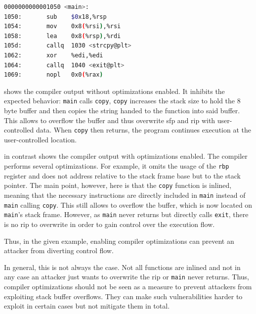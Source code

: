 \begin{lstlisting}[language=bash,float=ht,caption={Disassembly excerpt of the 64 bit binary compiled from the code in \cref{lst:optimization} with \texttt{gcc -o copy optimization.c -fno-stack-protector -O3}, retrieved with \texttt{objdump -D --no-show-raw-insn copy}}, label={lst:optimization-disassembly-optimized}]
0000000000001050 <main>:
1050:       sub    $0x18,%rsp
1054:       mov    0x8(%rsi),%rsi
1058:       lea    0x8(%rsp),%rdi
105d:       callq  1030 <strcpy@plt>
1062:       xor    %edi,%edi
1064:       callq  1040 <exit@plt>
1069:       nopl   0x0(%rax)
\end{lstlisting}

 shows the compiler output without optimizations enabled.
It inhibits the expected behavior: \texttt{main} calls \texttt{copy}, \texttt{copy} increases the stack size to hold the 8 byte buffer and then copies the string handed to the function into said buffer.
This allows to overflow the buffer and thus overwrite \gls{sfp} and \gls{rip} with user-controlled data.
When \texttt{copy} then returns, the program continues execution at the user-controlled location.

 in contrast shows the compiler output with optimizations enabled.
The compiler performs several optimizations.
For example, it omits the usage of the \texttt{rbp} register and does not address relative to the stack frame base but to the stack pointer.
The main point, however, here is that the \texttt{copy} function is inlined, meaning that the necessary instructions are directly included in \texttt{main} instead of \texttt{main} calling \texttt{copy}.
This still allows to overflow the buffer, which is now located on \texttt{main}'s stack frame.
However, as \texttt{main} never returns but directly calls \texttt{exit}, there is no \gls{rip} to overwrite in order to gain control over the execution flow.

Thus, in the given example, enabling compiler optimizations can prevent an attacker from diverting control flow.

In general, this is not always the case.
Not all functions are inlined and not in any case an attacker just wants to overwrite the \gls{rip} or \texttt{main} never returns.
Thus, compiler optimizations should not be seen as a measure to prevent attackers from exploiting stack buffer overflows.
They can make such vulnerabilities harder to exploit in certain cases but not mitigate them in total.

